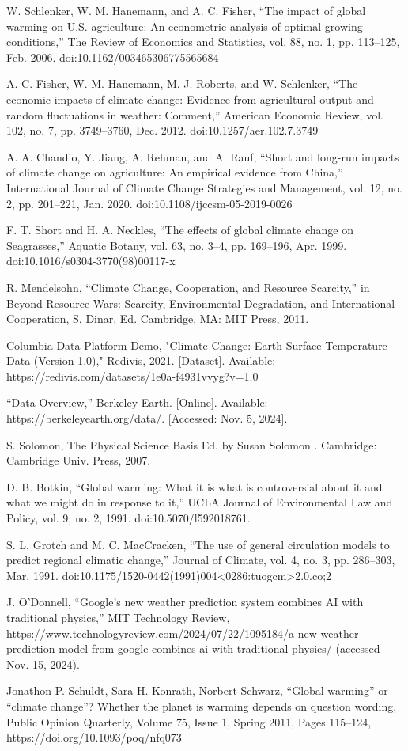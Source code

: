 \documentclass[conference]{IEEEtran}
\begin{document}
\begin{thebibliography}{00}
W. Schlenker, W. M. Hanemann, and A. C. Fisher, “The impact of global warming on U.S. agriculture: An econometric analysis of optimal growing conditions,” The Review of Economics and Statistics, vol. 88, no. 1, pp. 113–125, Feb. 2006. doi:10.1162/003465306775565684 

A. C. Fisher, W. M. Hanemann, M. J. Roberts, and W. Schlenker, “The economic impacts of climate change: Evidence from agricultural output and random fluctuations in weather: Comment,” American Economic Review, vol. 102, no. 7, pp. 3749–3760, Dec. 2012. doi:10.1257/aer.102.7.3749 

A. A. Chandio, Y. Jiang, A. Rehman, and A. Rauf, “Short and long-run impacts of climate change on agriculture: An empirical evidence from China,” International Journal of Climate Change Strategies and Management, vol. 12, no. 2, pp. 201–221, Jan. 2020. doi:10.1108/ijccsm-05-2019-0026 

F. T. Short and H. A. Neckles, “The effects of global climate change on Seagrasses,” Aquatic Botany, vol. 63, no. 3–4, pp. 169–196, Apr. 1999. doi:10.1016/s0304-3770(98)00117-x 

R. Mendelsohn, “Climate Change, Cooperation, and Resource Scarcity,” in Beyond Resource Wars: Scarcity, Environmental Degradation, and International Cooperation, S. Dinar, Ed. Cambridge, MA: MIT Press, 2011.

Columbia Data Platform Demo, "Climate Change: Earth Surface Temperature Data (Version 1.0)," Redivis, 2021. [Dataset]. Available: https://redivis.com/datasets/1e0a-f4931vvyg?v=1.0

“Data Overview,” Berkeley Earth. [Online]. Available: https://berkeleyearth.org/data/. [Accessed: Nov. 5, 2024].

S. Solomon, The Physical Science Basis Ed. by Susan Solomon . Cambridge: Cambridge Univ. Press, 2007.

D. B. Botkin, “Global warming: What it is what is controversial about it and what we might do in response to it,” UCLA Journal of Environmental Law and Policy, vol. 9, no. 2, 1991. doi:10.5070/l592018761.

S. L. Grotch and M. C. MacCracken, “The use of general circulation models to predict regional climatic change,” Journal of Climate, vol. 4, no. 3, pp. 286–303, Mar. 1991. doi:10.1175/1520-0442(1991)004\textless0286:tuogcm\textgreater2.0.co;2

J. O’Donnell, “Google’s new weather prediction system combines AI with traditional physics,” MIT Technology Review, https://www.technologyreview.com/2024/07/22/1095184/a-new-weather-prediction-model-from-google-combines-ai-with-traditional-physics/ (accessed Nov. 15, 2024). 

Jonathon P. Schuldt, Sara H. Konrath, Norbert Schwarz, “Global warming” or “climate change”? Whether the planet is warming depends on question wording, Public Opinion Quarterly, Volume 75, Issue 1, Spring 2011, Pages 115–124, https://doi.org/10.1093/poq/nfq073
\end{thebibliography}
\end{document}
